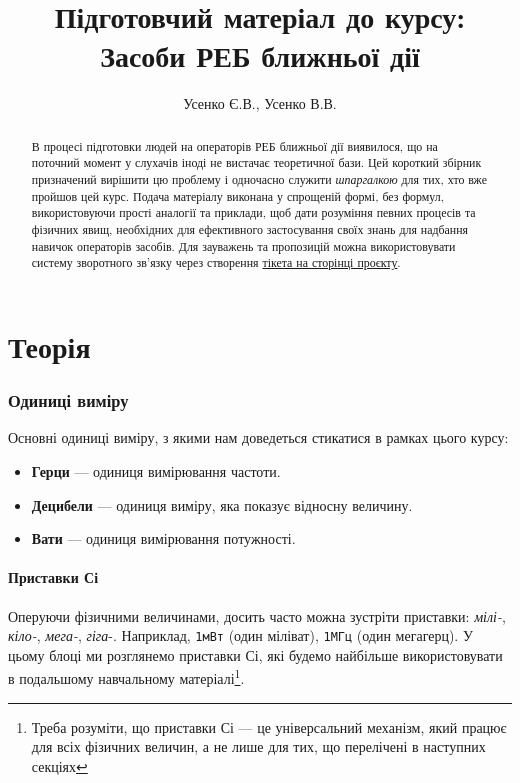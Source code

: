 \documentclass{article}
\title{Підготовчий матеріал до курсу: Засоби РЕБ ближньої дії }
\author{Усенко Є.В., Усенко В.В.}
\begin{document}
\maketitle
\begin{abstract}
В процесі підготовки людей на операторів РЕБ ближньої дії виявилося, що на поточний момент у слухачів іноді не вистачає теоретичної бази. Цей короткий збірник призначений вирішити цю проблему і одночасно служити \textit{шпаргалкою} для тих, хто вже пройшов цей курс. Подача матеріалу виконана у спрощеній формі, без формул, використовуючи прості аналогії та приклади, щоб дати розуміння певних процесів та фізичних явищ, необхідних для ефективного застосування своїх знань для надбання навичок операторів засобів. Для зауважень та пропозицій можна використовувати систему зворотного зв'язку через створення \href{https://github.com/usnbros/radio-101}{тікета на сторінці проєкту}.
\end{abstract}

\newpage
\tableofcontents

\newpage
\part{Теорія}
\section{Одиниці виміру}

Основні одиниці виміру, з якими нам доведеться стикатися в рамках цього курсу:

\begin{itemize}[noitemsep, topsep=8pt]
\item \textbf{Герци} — одиниця вимірювання частоти.
\item \textbf{Децибели} — одиниця виміру, яка показує відносну величину.
\item \textbf{Вати} — одиниця вимірювання потужності.
\end{itemize}

\subsection{Приставки Сі}
Оперуючи фізичними величинами, досить часто можна зустріти приставки: \textit{мілі-}, \textit{кіло-}, \textit{мега-}, \textit{гіга}-. Наприклад, \texttt{1мВт} (один міліват), \texttt{1МГц} (один мегагерц). У цьому блоці ми розглянемо приставки Сі, які будемо найбільше використовувати в подальшому навчальному матеріалі\footnote{Треба розуміти, що приставки Сі — це універсальний механізм, який працює для всіх фізичних величин, а не лише для тих, що перелічені в наступних секціях}.
\end{document}
